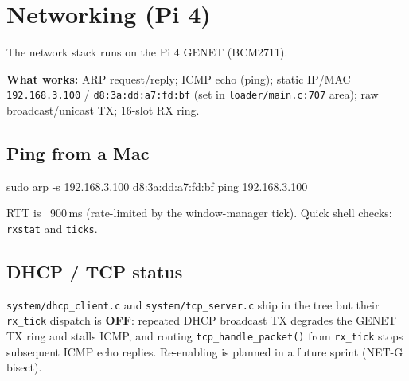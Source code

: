 \documentclass[a4paper,11pt]{article}
\begin{document}
\section{Networking (Pi 4)}
The network stack runs on the Pi 4 GENET (BCM2711).

\textbf{What works:} ARP request/reply; ICMP echo (ping); static IP/MAC
\verb|192.168.3.100| / \verb|d8:3a:dd:a7:fd:bf| (set in \verb|loader/main.c:707|
area); raw broadcast/unicast TX; 16-slot RX ring.

\subsection{Ping from a Mac}
\begin{code}
sudo arp -s 192.168.3.100 d8:3a:dd:a7:fd:bf
ping 192.168.3.100
\end{code}
RTT is ~900\,ms (rate-limited by the window-manager tick). Quick shell checks:
\verb|rxstat| and \verb|ticks|.

\subsection{DHCP / TCP status}
\verb|system/dhcp_client.c| and \verb|system/tcp_server.c| ship in the tree but
their \verb|rx_tick| dispatch is \textbf{OFF}: repeated DHCP broadcast TX
degrades the GENET TX ring and stalls ICMP, and routing \verb|tcp_handle_packet()|
from \verb|rx_tick| stops subsequent ICMP echo replies. Re-enabling is planned in
a future sprint (NET-G bisect).
\end{document}

